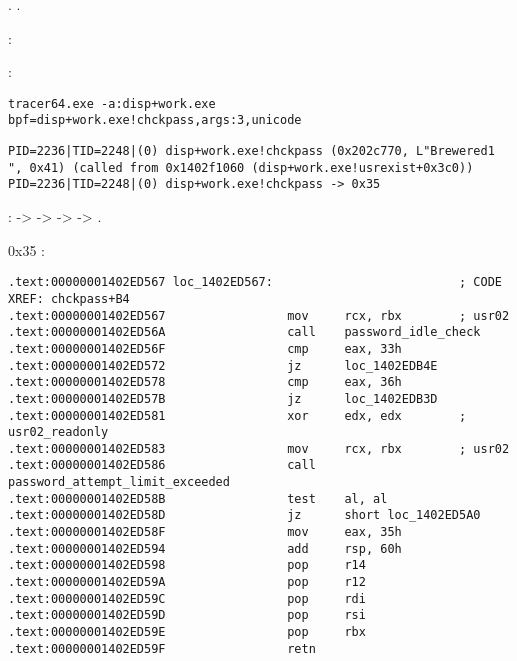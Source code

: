 . .

:

 \tracer:

\begin{lstlisting}
tracer64.exe -a:disp+work.exe bpf=disp+work.exe!chckpass,args:3,unicode
\end{lstlisting}

\begin{lstlisting}
PID=2236|TID=2248|(0) disp+work.exe!chckpass (0x202c770, L"Brewered1                               ", 0x41) (called from 0x1402f1060 (disp+work.exe!usrexist+0x3c0))
PID=2236|TID=2248|(0) disp+work.exe!chckpass -> 0x35
\end{lstlisting}

:  ->  ->  ->  -> .

 0x35   :

\begin{lstlisting}
.text:00000001402ED567 loc_1402ED567:                          ; CODE XREF: chckpass+B4
.text:00000001402ED567                 mov     rcx, rbx        ; usr02
.text:00000001402ED56A                 call    password_idle_check
.text:00000001402ED56F                 cmp     eax, 33h
.text:00000001402ED572                 jz      loc_1402EDB4E
.text:00000001402ED578                 cmp     eax, 36h
.text:00000001402ED57B                 jz      loc_1402EDB3D
.text:00000001402ED581                 xor     edx, edx        ; usr02_readonly
.text:00000001402ED583                 mov     rcx, rbx        ; usr02
.text:00000001402ED586                 call    password_attempt_limit_exceeded
.text:00000001402ED58B                 test    al, al
.text:00000001402ED58D                 jz      short loc_1402ED5A0
.text:00000001402ED58F                 mov     eax, 35h
.text:00000001402ED594                 add     rsp, 60h
.text:00000001402ED598                 pop     r14
.text:00000001402ED59A                 pop     r12
.text:00000001402ED59C                 pop     rdi
.text:00000001402ED59D                 pop     rsi
.text:00000001402ED59E                 pop     rbx
.text:00000001402ED59F                 retn
\end{lstlisting}


